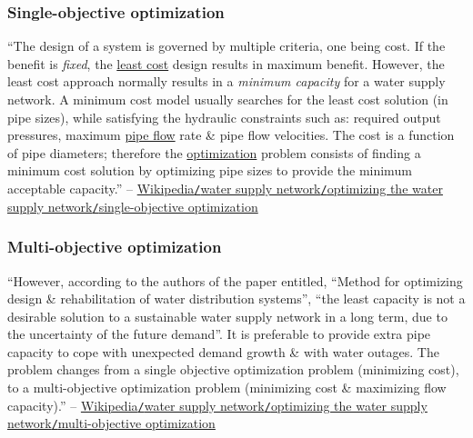 \documentclass[oneside]{book}
\numberwithin{equation}{section}
\begin{document}
\subsubsection{Single-objective optimization}
``The design of a system is governed by multiple criteria, one being cost. If the benefit is \textit{fixed}, the \href{https://en.wikipedia.org/wiki/Least-cost_routing}{least cost} design results in maximum benefit. However, the least cost approach normally results in a \textit{minimum capacity} for a water supply network. A minimum cost model usually searches for the least cost solution (in pipe sizes), while satisfying the hydraulic constraints such as: required output pressures, maximum \href{https://en.wikipedia.org/wiki/Pipe_flow}{pipe flow} rate \& pipe flow velocities. The cost is a function of pipe diameters; therefore the \href{https://en.wikipedia.org/wiki/Process_optimization}{optimization} problem consists of finding a minimum cost solution by optimizing pipe sizes to provide the minimum acceptable capacity.'' -- \href{https://en.wikipedia.org/wiki/Water_supply_network#Single-objective_optimization}{Wikipedia\texttt{/}water supply network\texttt{/}optimizing the water supply network\texttt{/}single-objective optimization} 

\subsubsection{Multi-objective optimization}
``However, according to the authors of the paper entitled, ``Method for optimizing design \& rehabilitation of water distribution systems'', ``the least capacity is not a desirable solution to a sustainable water supply network in a long term, due to the uncertainty of the future demand''. It is preferable to provide extra pipe capacity to cope with unexpected demand growth \& with water outages. The problem changes from a single objective optimization problem (minimizing cost), to a multi-objective optimization problem (minimizing cost \& maximizing flow capacity).'' -- \href{https://en.wikipedia.org/wiki/Water_supply_network#Multi-objective_optimization}{Wikipedia\texttt{/}water supply network\texttt{/}optimizing the water supply network\texttt{/}multi-objective optimization}
\end{document}
